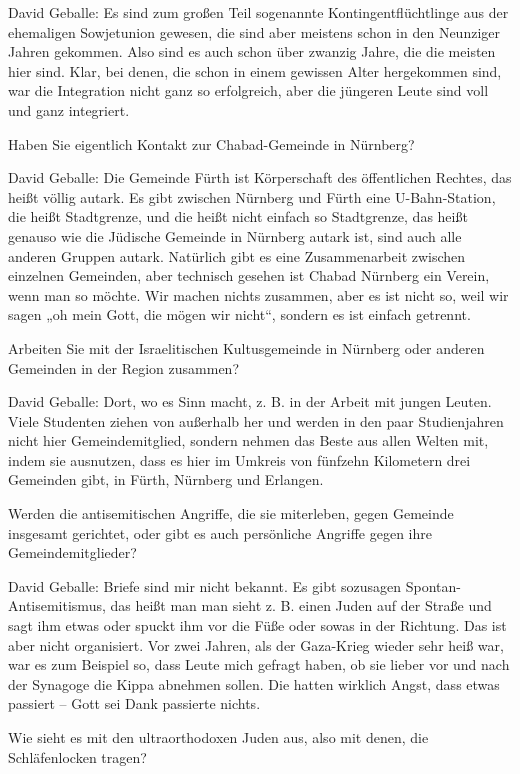 David Geballe: Es sind zum großen Teil sogenannte Kontingentflüchtlinge aus der ehemaligen Sowjetunion gewesen, die sind aber meistens schon in den Neunziger Jahren gekommen. Also sind es auch schon über zwanzig Jahre, die die meisten hier sind. Klar, bei denen, die schon in einem gewissen Alter hergekommen sind, war die Integration nicht ganz so erfolgreich, aber die jüngeren Leute sind voll und ganz integriert. 

Haben Sie eigentlich Kontakt zur Chabad-Gemeinde in Nürnberg? 

David Geballe: Die Gemeinde Fürth ist Körperschaft des öffentlichen Rechtes, das heißt völlig autark. Es gibt zwischen Nürnberg und Fürth eine U-Bahn-Station, die heißt Stadtgrenze, und die heißt nicht einfach so Stadtgrenze, das heißt genauso wie die Jüdische Gemeinde in Nürnberg autark ist, sind auch alle anderen Gruppen autark. Natürlich gibt es eine Zusammenarbeit zwischen einzelnen Gemeinden, aber technisch gesehen ist Chabad Nürnberg ein Verein, wenn man so möchte. Wir machen nichts zusammen, aber es ist nicht so, weil wir sagen „oh mein Gott, die mögen wir nicht“, sondern es ist einfach getrennt. 

Arbeiten Sie mit der Israelitischen Kultusgemeinde in Nürnberg oder anderen Gemeinden in der Region zusammen? 

David Geballe: Dort, wo es Sinn macht, z. B. in der Arbeit mit jungen Leuten. Viele Studenten ziehen von außerhalb her und werden in den paar Studienjahren nicht hier Gemeindemitglied, sondern nehmen das Beste aus allen Welten mit, indem sie ausnutzen, dass es hier im Umkreis von fünfzehn Kilometern drei Gemeinden gibt, in Fürth, Nürnberg und Erlangen. 

Werden die antisemitischen Angriffe, die sie miterleben, gegen Gemeinde insgesamt gerichtet, oder gibt es auch persönliche Angriffe gegen ihre Gemeindemitglieder? 

David Geballe: Briefe sind mir nicht bekannt. Es gibt sozusagen Spontan-Antisemitismus, das heißt man man sieht z. B. einen Juden auf der Straße und sagt ihm etwas oder spuckt ihm vor die Füße oder sowas in der Richtung. Das ist aber nicht organisiert. Vor zwei Jahren, als der Gaza-Krieg wieder sehr heiß war, war es zum Beispiel so, dass Leute mich gefragt haben, ob sie lieber vor und nach der Synagoge die Kippa abnehmen sollen. Die hatten wirklich Angst, dass etwas passiert – Gott sei Dank passierte nichts. 

 Wie sieht es mit den ultraorthodoxen Juden aus, also mit denen, die Schläfenlocken tragen? 

